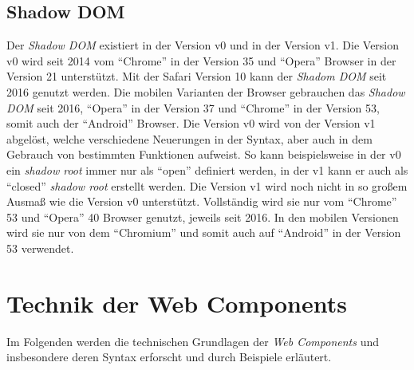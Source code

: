 \documentclass[12pt, paper=a4, bibtotoc, toc=listof, headsepline=true]{scrreprt}
\begin{document}
		\subsection{Shadow DOM}
		Der \emph{Shadow \ac{DOM}} existiert in der Version v0 und in der Version v1. Die Version v0 wird seit 2014 vom \enquote{Chrome} in der Version 35 und \enquote{Opera} Browser in der Version 21 unterstützt. Mit der Safari Version 10 kann der \emph{Shadom \ac{DOM}} seit 2016  genutzt werden\cite{NiwaShaDom}. Die mobilen Varianten der Browser gebrauchen das \emph{Shadow \ac{DOM}} seit 2016, \enquote{Opera} in der Version 37 und \enquote{Chrome} in der Version 53, somit auch der \enquote{Android} Browser\cite{Hayato2016}. Die Version v0 wird von der Version v1 abgelöst, welche verschiedene Neuerungen in der Syntax, aber auch in dem Gebrauch von bestimmten Funktionen aufweist. So kann beispielsweise in der v0 ein \emph{shadow root} immer nur als \enquote{open} definiert werden, in der v1 kann er auch als \enquote{closed} \emph{shadow root} erstellt werden\cite{Ito2016}.
		Die Version v1 wird noch nicht in so großem Ausmaß wie die Version v0 unterstützt. Vollständig wird sie nur vom \enquote{Chrome} 53 und \enquote{Opera} 40 Browser genutzt, jeweils seit 2016. In den mobilen Versionen wird sie nur von dem \enquote{Chromium} und somit auch auf \enquote{Android} in der Version 53 verwendet\cite{Hayato2016a}.
	
			
	\section{Technik der Web Components}
	Im Folgenden werden die technischen Grundlagen der \emph{Web Components} und insbesondere deren Syntax erforscht und durch Beispiele erläutert.
\end{document}
